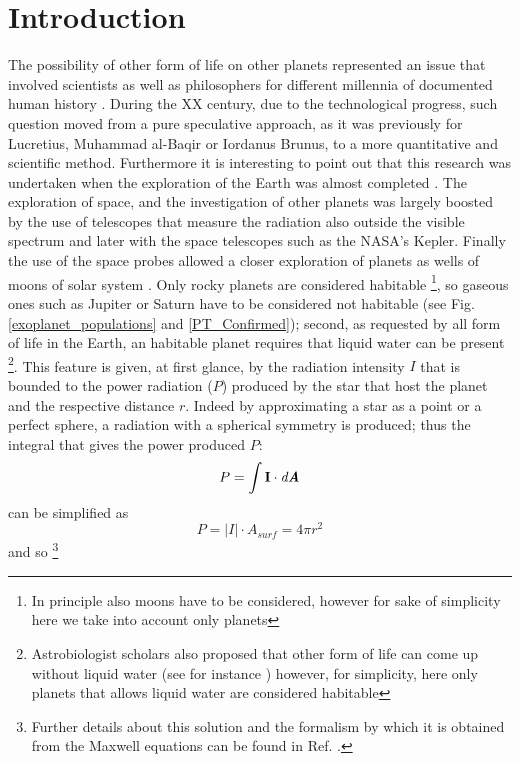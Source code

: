 \documentclass[
12pt, %
a4paper, %
oneside, %
headinclude,footinclude, %
BCOR5mm, %
]{scrartcl}
\begin{document}
\section{Introduction}
The possibility of other form of life on other planets represented an issue that involved scientists as well as philosophers for different millennia of documented human history \cite{papagiannis1985historical}. During the XX century, due to the technological progress, such question moved from a pure speculative approach, as it was previously for Lucretius, Muhammad al-Baqir or Iordanus Brunus, to a more quantitative and scientific method. Furthermore it is interesting to point out that this research was undertaken when the exploration of the Earth was almost completed \cite{fleming2001barrow}. The exploration of space, and the investigation of other planets was largely boosted by the use of telescopes that measure the radiation also outside the visible spectrum and later with the space telescopes such as the NASA's Kepler. Finally the use of the space probes allowed a closer exploration of planets as wells of moons of solar system \cite{space_probes}. 
Only rocky planets are considered habitable \footnote{In principle also moons have to be considered, however for sake of simplicity here we take into account only planets}, so gaseous ones such as Jupiter or Saturn have to be considered not habitable (see Fig. \ref{exoplanet_populations} and \ref{PT_Confirmed}); second, as requested by all form of life in the Earth, an habitable planet requires that liquid water can be present \cite{seager2013exoplanet,mckay2014requirements,rothschild2001life} \footnote{Astrobiologist scholars also proposed that other form of life can come up without liquid water (see for instance \cite{rahm2016polymorphism}) however, for simplicity, here only planets that allows liquid water are considered habitable}. This feature is given, at first glance, by the radiation intensity $I$ that is bounded to the power radiation ($P$) produced by the star that host the planet and the respective distance $r$. Indeed by approximating a star as a point or a perfect sphere, a radiation with a spherical symmetry is produced; thus the integral that gives the power produced $P$: 
\begin{equation}
P=\int \textbf{I}\cdot \textit{d\textbf{A}}
\end{equation}
can be simplified as 
\begin{equation}
P=\lvert I \rvert \cdot A_{surf}=4\pi r^{2}
\end{equation}
and so  \footnote{Further details about this solution and the formalism by which it is obtained from the Maxwell equations can be found in Ref. \cite{feynman}.}
\end{document}
